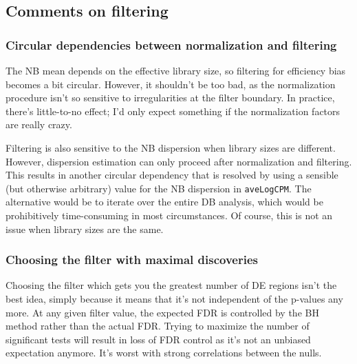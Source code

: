 \documentclass[12pt]{report}
\newcommand{\code}[1]{{\small\texttt{#1}}}
\begin{document}
\subsection*{Comments on filtering}

\subsubsection*{Circular dependencies between normalization and filtering}
The NB mean depends on the effective library size, so filtering for efficiency bias becomes a bit circular.
However, it shouldn't be too bad, as the normalization procedure isn't so sensitive to irregularities at the filter boundary.
In practice, there's little-to-no effect; I'd only expect something if the normalization factors are really crazy.


Filtering is also sensitive to the NB dispersion when library sizes are different.
However, dispersion estimation can only proceed after normalization and filtering. 
This results in another circular dependency that is resolved by using a sensible (but otherwise arbitrary) value for the NB dispersion in \code{aveLogCPM}. 
The alternative would be to iterate over the entire DB analysis, which would be prohibitively time-consuming in most circumstances.
Of course, this is not an issue when library sizes are the same.

\subsubsection*{Choosing the filter with maximal discoveries}

Choosing the filter which gets you the greatest number of DE regions isn't the best idea, simply because it means that it's not independent of the p-values any more. 
At any given filter value, the expected FDR is controlled by the BH method rather than the actual FDR. 
Trying to maximize the number of significant tests will result in loss of FDR control as it's not an unbiased expectation anymore. 
It's worst with strong correlations between the nulls.
\end{document}
